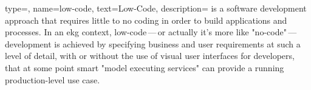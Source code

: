  {
    type=\glsdefaulttype,
    name={low-code},
    text={Low-Code},
    description={%
        is a software development approach that requires little to no coding in order to build applications and processes.
        In an \gls{ekg} context, low-code\,---\,or actually it's more like "no-code"\,---\,development is achieved by
        specifying business and user requirements at such a level of detail, with or without the use of
        visual user interfaces for developers, that at some point smart "model executing services" can provide a running
        production-level use case.
    }
}
